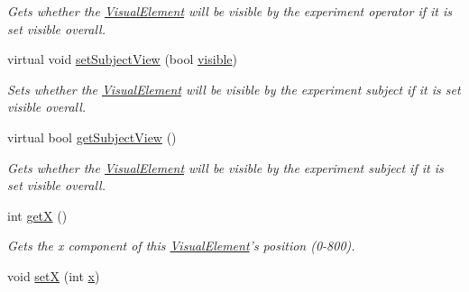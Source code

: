 \begin{DoxyCompactItemize}
\begin{DoxyCompactList}\small\item\em Gets whether the \hyperlink{struct_picto_1_1_visual_element}{Visual\-Element} will be visible by the experiment operator if it is set visible overall. \end{DoxyCompactList}\item 
\hypertarget{struct_picto_1_1_visual_element_ab8ca7d32b82efa14e9a562005eeada6c}{virtual void \hyperlink{struct_picto_1_1_visual_element_ab8ca7d32b82efa14e9a562005eeada6c}{set\-Subject\-View} (bool \hyperlink{struct_picto_1_1_visual_element_a81a6de4e406cc6e3d8c7ac6398334d6c}{visible})}\label{struct_picto_1_1_visual_element_ab8ca7d32b82efa14e9a562005eeada6c}

\begin{DoxyCompactList}\small\item\em Sets whether the \hyperlink{struct_picto_1_1_visual_element}{Visual\-Element} will be visible by the experiment subject if it is set visible overall. \end{DoxyCompactList}\item 
\hypertarget{struct_picto_1_1_visual_element_a30c985ecbc6896864056f045b7607aa4}{virtual bool \hyperlink{struct_picto_1_1_visual_element_a30c985ecbc6896864056f045b7607aa4}{get\-Subject\-View} ()}\label{struct_picto_1_1_visual_element_a30c985ecbc6896864056f045b7607aa4}

\begin{DoxyCompactList}\small\item\em Gets whether the \hyperlink{struct_picto_1_1_visual_element}{Visual\-Element} will be visible by the experiment subject if it is set visible overall. \end{DoxyCompactList}\item 
\hypertarget{struct_picto_1_1_visual_element_ad49af3663170ff1482c6e68623be1d5a}{int \hyperlink{struct_picto_1_1_visual_element_ad49af3663170ff1482c6e68623be1d5a}{get\-X} ()}\label{struct_picto_1_1_visual_element_ad49af3663170ff1482c6e68623be1d5a}

\begin{DoxyCompactList}\small\item\em Gets the x component of this \hyperlink{struct_picto_1_1_visual_element}{Visual\-Element}'s position (0-\/800). \end{DoxyCompactList}\item 
\hypertarget{struct_picto_1_1_visual_element_a874588aa4c88502be103ad8b32a0d5a1}{void \hyperlink{struct_picto_1_1_visual_element_a874588aa4c88502be103ad8b32a0d5a1}{set\-X} (int \hyperlink{struct_picto_1_1_visual_element_a1b50bc5fa41868f661687015be3c97e8}{x})}\label{struct_picto_1_1_visual_element_a874588aa4c88502be103ad8b32a0d5a1}


\end{DoxyCompactItemize}

